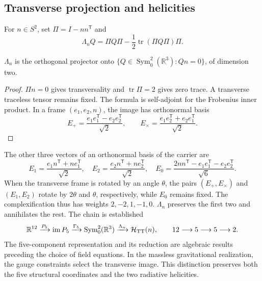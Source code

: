 \subsection{Transverse projection and helicities}
For \(n\in S^2\), set \(\Pi=I-nn^{\mathsf T}\) and
\[
 \Lambda_nQ=\Pi Q\Pi-\frac12\operatorname{tr}(\Pi Q\Pi)\Pi.
\]
\begin{proposition}
\(\Lambda_n\) is the orthogonal projector onto
\(\{Q\in\operatorname{Sym}^2_0(\mathbb R^3):Qn=0\}\), of dimension two.
\end{proposition}
\begin{proof}
\(\Pi n=0\) gives transversality and \(\operatorname{tr}\Pi=2\) gives
zero trace. A transverse traceless tensor remains fixed.
The formula is self-adjoint for the Frobenius inner product.
In a frame \((e_1,e_2,n)\), the image has orthonormal basis
\[
 E_+=\frac{e_1e_1^{\mathsf T}-e_2e_2^{\mathsf T}}{\sqrt2},\qquad
 E_\times=\frac{e_1e_2^{\mathsf T}+e_2e_1^{\mathsf T}}{\sqrt2}.
\]
\end{proof}
The other three vectors of an orthonormal basis of the carrier are
\[
 E_1=\frac{e_1n^{\mathsf T}+ne_1^{\mathsf T}}{\sqrt2},\quad
 E_2=\frac{e_2n^{\mathsf T}+ne_2^{\mathsf T}}{\sqrt2},\quad
 E_0=\frac{2nn^{\mathsf T}-e_1e_1^{\mathsf T}-e_2e_2^{\mathsf T}}{\sqrt6}.
\]
When the transverse frame is rotated by an angle \(\theta\), the pairs
\((E_+,E_\times)\) and \((E_1,E_2)\) rotate by \(2\theta\) and
\(\theta\), respectively, while \(E_0\) remains fixed. The
complexification thus has weights \(2,-2,1,-1,0\).
\(\Lambda_n\) preserves the first two and annihilates the rest.
The chain is established
\[
 \mathbb R^{12}\xrightarrow{P_5}\operatorname{im}P_5
 \xrightarrow{\Gamma_5}\operatorname{Sym}^2_0(\mathbb R^3)
 \xrightarrow{\Lambda_n}\mathcal H_{\rm TT}(n),
 \qquad 12\longrightarrow5\longrightarrow5\longrightarrow2.
\]
The five-component representation and its reduction are algebraic
results preceding the choice of field equations.
In the massless gravitational realization, the gauge constraints
select the transverse image. This distinction preserves both the
five structural coordinates and the two radiative helicities.

